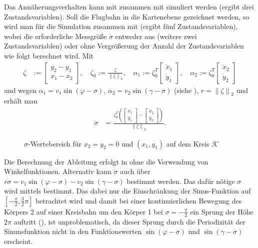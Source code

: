 Das Annäherungsverhalten kann mit  zusammen mit  simuliert werden (ergibt drei Zustandsvariablen). Soll die
Flugbahn in die Kartenebene gezeichnet werden, so wird man für die Simulation  zusammen mit  (ergibt fünf
Zustandsvariablen), wobei die erforderliche Messgröße $\dot{\sigma}$ entweder aus  (weitere zwei Zustandsvariablen) oder ohne Vergrößerung der Anzahl
der Zustandsvariablen wie folgt berechnet wird. Mit
\begin{align}
	\zeta & := \begin{bmatrix}
	y_2 - y_1\\
	x_1 - x_2
	\end{bmatrix},\quad \zeta_0:=\frac{\zeta}{\left\| \zeta \right\|_2},\quad \alpha_1:=\zeta_0^T\begin{bmatrix}
	\dot{x}_1 \\ \dot{y}_1
	\end{bmatrix},\quad \alpha_2:=\zeta_0^T\begin{bmatrix}
	\dot{x}_2\\ \dot{y}_2
	\end{bmatrix}
\end{align}
und wegen $\alpha_1 = v_1 \sin(\varphi - \sigma)$, $\alpha_2 = v_2 \sin(\gamma - \sigma)$ (siehe ), $r = \left\|\zeta \right\|_2$ und
 erhält man
\begin{align}
	\dot{\sigma} & = \frac{\zeta_0^T\left( \begin{bmatrix}
	\dot{x}_1 \\ \dot{y}_1
	\end{bmatrix} - \begin{bmatrix} 
	\dot{x}_2 \\ \dot{y}_2
	\end{bmatrix}\right)}{\left\| \zeta \right\|_2}.	\label{eqn:kap_3_bsp_rf_messgroesse}
\end{align}
\begin{figure}[htb]
	\centering
	
	\caption{$\sigma$-Wertebereich für $x_2=y_2=0$ und $(x_1,y_1)$ auf dem Kreis $\mathcal{K}$}
	\label{fig:kap_3_bsp_rf_wertebereich}
\end{figure}
\begin{remark}
Die Berechnung der Ableitung erfolgt in  ohne die Verwendung von Winkelfunktionen. Alternativ kann $\dot{\sigma}$ auch über
$r\dot{\sigma}=v_1\sin(\varphi - \sigma)-v_2\sin(\gamma - \sigma)$ bestimmt werden. Das dafür nötige $\sigma$ wird mittels  bestimmt. Das dabei nur die
Einschränkung der Sinus-Funktion auf $\left[-\frac{\pi}{2},\frac{3}{2}\pi \right]$ betrachtet wird und damit bei einer kontinuierlichen Bewegung des Körpers 2 auf einer Kreisbahn um den Körper 1 bei
$\sigma = -\frac{\pi}{2}$ ein Sprung der Höhe $2\pi$ auftritt (), ist unproblematisch, da dieser Sprung durch die Periodizität der Sinunsfunktion
nicht in den Funktionswerten $\sin(\varphi - \sigma)$ und $\sin(\gamma - \sigma)$ erscheint.
\end{remark}
